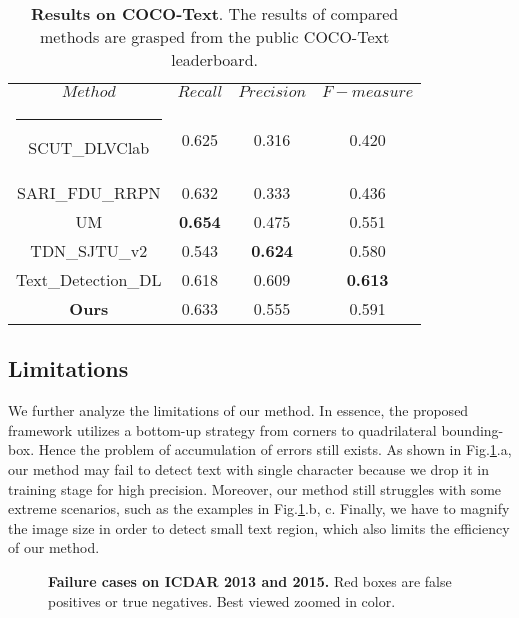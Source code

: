\documentclass[3p, times]{elsarticle}
\makeatletter
\newcommand{\thickhline}{\noalign {\ifnum 0=`}\fi \hrule height 1pt
    \futurelet \reserved@a \@xhline
}
\newcommand{\topcaption}{\setlength{\abovecaptionskip}{0pt}\setlength{\belowcaptionskip}{8pt}\caption}
\makeatother
\begin{document}
\setlength{\tabcolsep}{14pt}
\begin{table}[!htb]
\centering
\topcaption{\textbf{Results on COCO-Text}. The results of compared methods are grasped from the public COCO-Text leaderboard.}
\label{Table_4}
\begin{tabular}{|c|c|c|c|}
    \hline
    $Method$            & $Recall$    & $Precision$ & $F-measure$ \\\thickhline
    SCUT\_DLVClab       & 0.625       & 0.316       & 0.420       \\\hline
    SARI\_FDU\_RRPN     & 0.632       & 0.333       & 0.436       \\\hline
    UM                  & {\bf 0.654} & 0.475       & 0.551       \\\hline
    TDN\_SJTU\_v2       & 0.543       & {\bf 0.624} & 0.580       \\\hline
    Text\_Detection\_DL & 0.618       & 0.609       & {\bf 0.613} \\\hline
    \textbf{Ours}       & 0.633       & 0.555       & 0.591       \\\hline
\end{tabular}
\end{table}
\setlength{\tabcolsep}{1.4pt}



\subsection{Limitations}
We further analyze the limitations of our method. In essence, the proposed framework utilizes a bottom-up strategy from corners to quadrilateral bounding-box. Hence the problem of accumulation of errors still exists. As shown in Fig.\ref{Fig_6}.a, our method may fail to detect text with single character because we drop it in training stage for high precision. Moreover, our method still struggles with some extreme scenarios, such as the examples in Fig.\ref{Fig_6}.b, c. Finally, we have to magnify the image size in order to detect small text region, which also limits the efficiency of our method. 



\begin{figure}[!htb]
  \centering
  \hspace{-0.5ex}
  \hspace{-0.5ex}
  \caption{\textbf{Failure cases on ICDAR 2013 and 2015.} Red boxes are false positives or true negatives. Best viewed zoomed in color.}
  \label{Fig_6} 
\end{figure}
\end{document}

